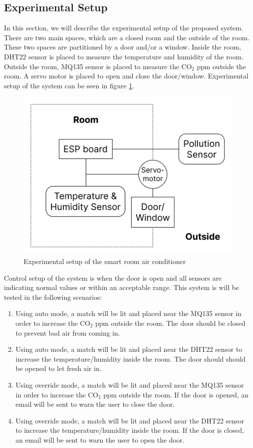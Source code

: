 \subsection{Experimental Setup}
In this section, we will describe the experimental setup of the proposed system.
There are two main spaces, which are a closed room and the outside of the room.
These two spaces are partitioned by a door and/or a window. Inside the room,
DHT22 sensor is placed to measure the temperature and humidity of the room.
Outside the room, MQ135 sensor is placed to measure the CO$_2$ ppm outside the room.
A servo motor is placed to open and close the door/window.
Experimental setup of the system can be seen in figure \ref{setup}.

\begin{figure}
    \centerline{\includegraphics[scale=0.4]{resources/setup.png}}
    \caption{Experimental setup of the smart room air conditioner}
    \label{setup}
\end{figure}

Control setup of the system is when the door is open and all sensors are
indicating normal values or within an acceptable range. This system is will be
tested in the following scenarios:
\begin{enumerate}
    \item Using auto mode, a match will be lit and placed near the MQ135 sensor
          in order to increase the CO$_2$ ppm outside the room. The door should
          be closed to prevent bad air from coming in.
    \item Using auto mode, a match will be lit and placed near the DHT22 sensor
          to increase the temperature/humidity inside the room. The door should
          should be opened to let fresh air in.
    \item Using override mode, a match will be lit and placed near the MQ135
          sensor in order to increase the CO$_2$ ppm outside the room. If the door
          is opened, an email will be sent to warn the user to close the door.
    \item Using override mode, a match will be lit and placed near the DHT22
          sensor to increase the temperature/humidity inside the room. If the door
          is closed, an email will be sent to warn the user to open the door.
\end{enumerate}

